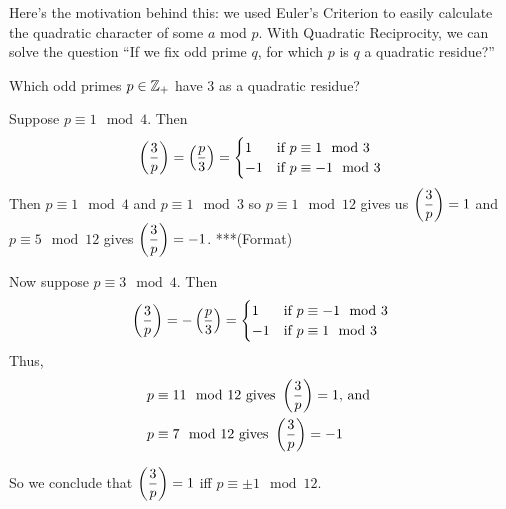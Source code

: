 Here's the motivation behind this: we used Euler's Criterion to easily calculate the quadratic character of some $a$ mod $p$. With Quadratic Reciprocity, we can solve the question ``If we fix odd prime $q$, for which $p$ is $q$ a quadratic residue?''

\begin{example}
    Which odd primes $p\in\mathbb Z_+$ have $3$ as a quadratic residue?

    Suppose $p\equiv 1\mod 4$. Then
    \[\left(\dfrac{3}{p}\right) = \left(\dfrac{p}{3}\right) = \begin{cases}
            1  & \text{if $p\equiv 1\mod 3$}  \\
            -1 & \text{if $p\equiv -1\mod 3$}
        \end{cases}\]
    Then $p\equiv 1\mod 4$ and $p\equiv 1\mod 3$ so $p\equiv 1\mod 12$ gives us $\left(\dfrac{3}{p}\right) = 1$ and $p\equiv 5\mod 12$ gives $\left(\dfrac{3}{p}\right) = -1$. ***(Format)

    Now suppose $p\equiv 3\mod 4$. Then
    \[\left(\dfrac{3}{p}\right) = -\left(\dfrac{p}{3}\right) = \begin{cases}
            1  & \text{if $p\equiv -1\mod 3$} \\
            -1 & \text{if $p\equiv 1\mod 3$}
        \end{cases}\]
    Thus,
    \begin{align*}
        p & \equiv 11\mod 12\text{ gives }\left(\dfrac{3}{p}\right) = 1\text{, and } \\
        p & \equiv 7\mod 12\text{ gives }\left(\dfrac{3}{p}\right) = -1
    \end{align*}

    So we conclude that $\left(\dfrac{3}{p}\right) = 1$ iff $p\equiv \pm 1\mod 12$.
\end{example}